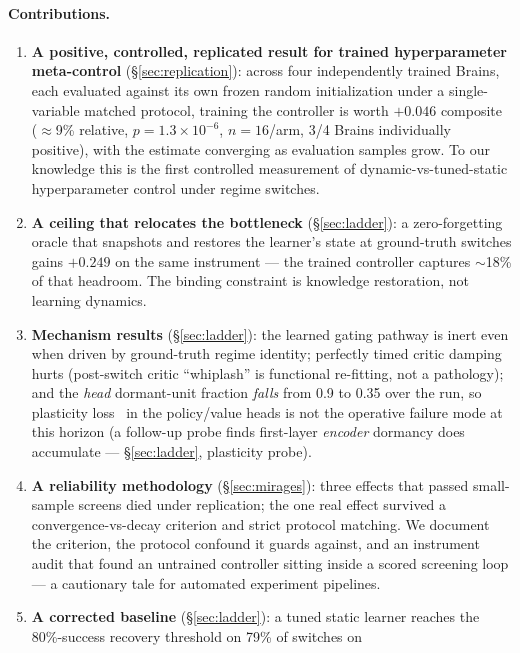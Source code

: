 \documentclass[11pt]{article}
\begin{document}
\paragraph{Contributions.}
\begin{enumerate}
  \item \textbf{A positive, controlled, replicated result for trained
  hyperparameter meta-control} (\S\ref{sec:replication}): across four
  independently trained Brains, each evaluated against its own frozen random
  initialization under a single-variable matched protocol, training the
  controller is worth $+0.046$ composite ($\approx$9\% relative,
  $p=1.3\times10^{-6}$, $n{=}16$/arm, 3/4 Brains individually positive), with
  the estimate converging as evaluation samples grow. To our knowledge this is
  the first controlled measurement of dynamic-vs-tuned-static hyperparameter
  control under regime switches.
  \item \textbf{A ceiling that relocates the bottleneck}
  (\S\ref{sec:ladder}): a zero-forgetting oracle that snapshots and restores
  the learner's state at ground-truth switches gains $+0.249$ on the same
  instrument --- the trained controller captures $\sim$18\% of that
  headroom. The binding constraint is knowledge restoration, not learning
  dynamics.
  \item \textbf{Mechanism results} (\S\ref{sec:ladder}): the learned
  gating pathway is inert even when driven by ground-truth regime identity;
  perfectly timed critic damping hurts (post-switch critic ``whiplash'' is
  functional re-fitting, not a pathology); and the \emph{head} dormant-unit
  fraction \emph{falls} from 0.9 to 0.35 over the run, so plasticity
  loss~\citep{dohare2024plasticity,sokar2023dormant} in the policy/value
  heads is not the operative failure mode at this horizon (a follow-up probe
  finds first-layer \emph{encoder} dormancy does accumulate ---
  \S\ref{sec:ladder}, plasticity probe).
  \item \textbf{A reliability methodology} (\S\ref{sec:mirages}): three
  effects that passed small-sample screens died under replication; the one
  real effect survived a convergence-vs-decay criterion and strict protocol
  matching. We document the criterion, the protocol confound it guards
  against, and an instrument audit that found an untrained controller sitting
  inside a scored screening loop --- a cautionary tale for automated
  experiment pipelines.
  \item \textbf{A corrected baseline} (\S\ref{sec:ladder}): a tuned static
  learner reaches the 80\%-success recovery threshold on 79\% of switches on

\end{enumerate}
\end{document}
